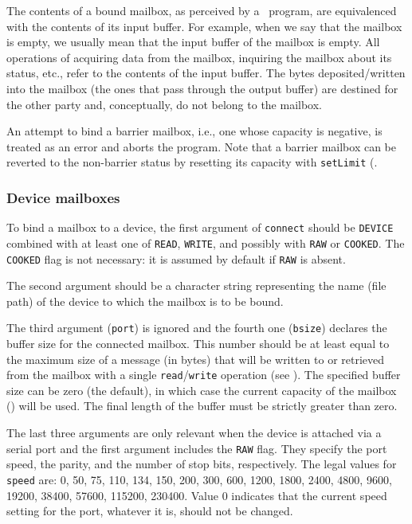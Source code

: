 The contents of a bound mailbox, as perceived by a \smurph\ program, are
equivalenced with the contents of its input buffer.
For example, when we say that the mailbox is empty, we usually mean that
the input buffer of the mailbox is empty.
All operations of acquiring data from the mailbox, inquiring the mailbox
about its status, etc., refer to the contents of the input buffer.
The bytes deposited/written into the mailbox (the ones that pass through the
output buffer) are destined for the other party and, conceptually, do not
belong to the mailbox.

An attempt to bind a barrier mailbox, i.e., one whose capacity is negative,
is treated as an error and aborts the program.
Note that a barrier mailbox can be reverted to the non-barrier status by
resetting its capacity with {\tt setLimit} (.

\subsubsection{Device mailboxes}
\label{rm_mb_bo_de}

To bind a mailbox to a device, the first argument of {\tt connect}
should be {\tt DEVICE} combined with at least one of {\tt READ},
{\tt WRITE}, and possibly with {\tt RAW} or {\tt COOKED}.
The {\tt COOKED} flag is not necessary: it is assumed by default if
{\tt RAW} is absent.

The second argument should be a character string representing the
name (file path) of the device to which the mailbox is to be bound.

The third argument ({\tt port}) is ignored and the fourth one ({\tt bsize})
declares the buffer size for the connected mailbox.
This number should be at least equal to the maximum size of a message
(in bytes) that will be written to or retrieved from the mailbox with a single
{\tt read}/{\tt write} operation (see ).
The specified buffer size can be zero (the default), in which case the
current capacity of the mailbox () will be used.
The final length of the buffer must be strictly greater than zero.

The last three arguments are only relevant when the
device is attached via a serial port and the first
argument includes the {\tt RAW} flag.
They specify the port speed, the parity, and the number of stop bits,
respectively.
The legal values for {\tt speed} are:
0, 50, 75, 110, 134, 150, 200, 300, 600, 1200, 1800, 2400,
4800, 9600, 19200, 38400, 57600, 115200, 230400.
Value 0 indicates that the current speed setting for the port,
whatever it is, should not be changed.

